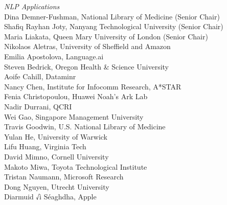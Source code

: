 \emph{NLP Applications} \\
\hspace*{0.2in} Dina Demner-Fushman, National Library of Medicine (Senior Chair)\\
\hspace*{0.2in} Shafiq Rayhan Joty, Nanyang Technological University (Senior Chair)\\
\hspace*{0.2in} Maria Liakata, Queen Mary University of London (Senior Chair)\\
\hspace*{0.2in} Nikolaos Aletras, University of Sheffield and Amazon\\
\hspace*{0.2in} Emilia Apostolova, Language.ai\\
\hspace*{0.2in} Steven Bedrick, Oregon Health \& Science University\\
\hspace*{0.2in} Aoife Cahill, Dataminr\\
\hspace*{0.2in} Nancy Chen, Institute for Infocomm Research, A*STAR\\
\hspace*{0.2in} Fenia Christopoulou, Huawei Noah's Ark Lab\\
\hspace*{0.2in} Nadir Durrani, QCRI\\
\hspace*{0.2in} Wei Gao, Singapore Management University\\
\hspace*{0.2in} Travis Goodwin, U.S. National Library of Medicine\\
\hspace*{0.2in} Yulan He, University of Warwick\\
\hspace*{0.2in} Lifu Huang, Virginia Tech\\
\hspace*{0.2in} David Mimno, Cornell University\\
\hspace*{0.2in} Makoto Miwa, Toyota Technological Institute\\
\hspace*{0.2in} Tristan Naumann, Microsoft Research\\
\hspace*{0.2in} Dong Nguyen, Utrecht University\\
\hspace*{0.2in} Diarmuid √ì S\'eaghdha, Apple\\
